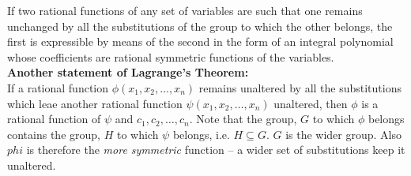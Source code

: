 \begin{theorem} If two rational functions of any set of variables are such that one remains unchanged by all the substitutions of the group to
which the other belongs, the first is expressible by means of the second in the form of an integral polynomial whose coefficients are rational symmetric functions of the variables. \\

{\bf Another statement of Lagrange's Theorem: } \\

If a rational function $\phi(x_1,x_2, \hdots, x_n)$ remains unaltered by all the substitutions which leae another rational function $\psi(x_1, x_2, \hdots, x_n)$ unaltered, then $\phi$ is
a rational function of $\psi$ and $c_1, c_2, \hdots, c_n$. Note that the group, $G$ to which $\phi$ belongs contains the group, $H$ to which $\psi$ belongs, i.e. $H\subseteq G$. $G$ is the
wider group. Also $phi$ is therefore the {\it more symmetric} function -- a wider set of substitutions keep it unaltered.
\end{theorem}

